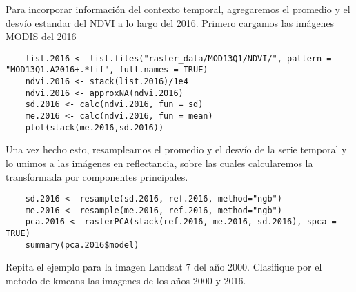 \begin{exa}
  Para incorporar informaci\'on del contexto temporal, agregaremos el promedio y el desv\'io estandar del NDVI a lo largo del 2016. Primero cargamos las im\'agenes MODIS del 2016

  \begin{lstlisting}
    list.2016 <- list.files("raster_data/MOD13Q1/NDVI/", pattern = "MOD13Q1.A2016+.*tif", full.names = TRUE)
    ndvi.2016 <- stack(list.2016)/1e4
    ndvi.2016 <- approxNA(ndvi.2016)
    sd.2016 <- calc(ndvi.2016, fun = sd)
    me.2016 <- calc(ndvi.2016, fun = mean)
    plot(stack(me.2016,sd.2016))
  \end{lstlisting}

  Una vez hecho esto, resampleamos el promedio y el desv\'io de la serie temporal y lo unimos a las im\'agenes en reflectancia, sobre las cuales calcularemos la transformada por componentes principales.

  \begin{lstlisting}
    sd.2016 <- resample(sd.2016, ref.2016, method="ngb")
    me.2016 <- resample(me.2016, ref.2016, method="ngb")
    pca.2016 <- rasterPCA(stack(ref.2016, me.2016, sd.2016), spca = TRUE)
    summary(pca.2016$model)
  \end{lstlisting}
\end{exa}

\begin{act}
  Repita el ejemplo para la imagen Landsat 7 del año 2000. Clasifique por el metodo de kmeans las imagenes de los años 2000 y 2016.
\end{act}
